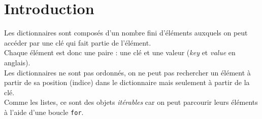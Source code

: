 \def\xxactivite{Cours}

\def\xxauteur{P. Bessonnat -- Xavier Pessoles}
\fichefalse \proftrue \tdfalse \courstrue

\def\xxnumchapitre{Chapitre 10 \vspace{.2cm}}

\def\xxchapitre{Dictionnaires -- Mémo}

\def\xxcompetences{%
\textsl{%
\textbf{Savoirs et compétences :}\\
\begin{itemize}[label=\ding{112},font=\color{bleuxp}] 
\item Dictionnaires.
\end{itemize}
}}

\def\xxfigures{
}%



\setlength{\columnseprule}{.1pt}

\vspace{2cm}
\pagestyle{fancy}
\thispagestyle{plain}

% 
%



\section{Introduction}

Les dictionnaires sont composés d'un nombre fini d'éléments auxquels on peut accéder par une clé qui fait partie de l'élément.\\
Chaque élément est donc une paire : une clé et une valeur (\textit{key} et \textit{value} en anglais).\\
Les dictionnaires ne sont pas ordonnés, on ne peut pas rechercher un élément à partir de sa position (indice) dans le dictionnaire mais seulement à partir de la clé.\\
Comme les listes, ce sont des objets \textit{itérables} car on peut parcourir leurs éléments à l'aide d'une boucle \texttt{for}.


